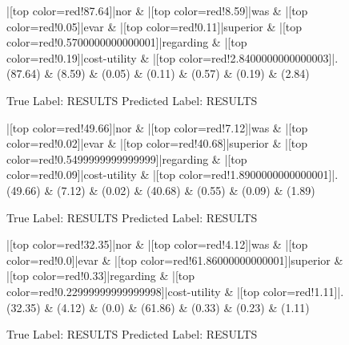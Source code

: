 \documentclass[a4paper, landscape]{article}
\begin{document}
\begin{figure}
\begin{center}
\begin{dependency}
\begin{deptext}
|[top color=red!87.64]|nor \& |[top color=red!8.59]|was \& |[top color=red!0.05]|evar \& |[top color=red!0.11]|superior \& |[top color=red!0.5700000000000001]|regarding \& |[top color=red!0.19]|cost-utility \& |[top color=red!2.8400000000000003]|.\\
(87.64) \& (8.59) \& (0.05) \& (0.11) \& (0.57) \& (0.19) \& (2.84)\\
\end{deptext}
\end{dependency}
\end{center}
\caption{True Label: RESULTS Predicted Label: RESULTS}
\end{figure}
\clearpage
\begin{figure}
\begin{center}
\begin{dependency}
\begin{deptext}
|[top color=red!49.66]|nor \& |[top color=red!7.12]|was \& |[top color=red!0.02]|evar \& |[top color=red!40.68]|superior \& |[top color=red!0.5499999999999999]|regarding \& |[top color=red!0.09]|cost-utility \& |[top color=red!1.8900000000000001]|.\\
(49.66) \& (7.12) \& (0.02) \& (40.68) \& (0.55) \& (0.09) \& (1.89)\\
\end{deptext}
\end{dependency}
\end{center}
\caption{True Label: RESULTS Predicted Label: RESULTS}
\end{figure}
\clearpage
\begin{figure}
\begin{center}
\begin{dependency}
\begin{deptext}
|[top color=red!32.35]|nor \& |[top color=red!4.12]|was \& |[top color=red!0.0]|evar \& |[top color=red!61.86000000000001]|superior \& |[top color=red!0.33]|regarding \& |[top color=red!0.22999999999999998]|cost-utility \& |[top color=red!1.11]|.\\
(32.35) \& (4.12) \& (0.0) \& (61.86) \& (0.33) \& (0.23) \& (1.11)\\
\end{deptext}
\end{dependency}
\end{center}
\caption{True Label: RESULTS Predicted Label: RESULTS}
\end{figure}
\end{document}
